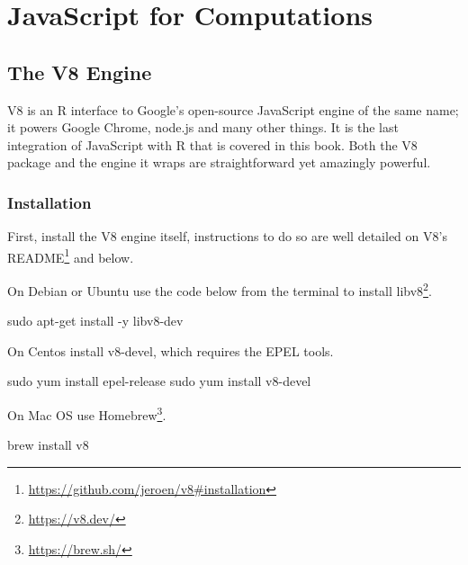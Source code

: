 \documentclass[
]{krantz}
\makeatletter
\newenvironment{Shaded}{\begin{snugshade}}{\end{snugshade}}
\newcommand{\ExtensionTok}[1]{#1}
\newcommand{\FunctionTok}[1]{\textcolor[rgb]{0,0,0}{#1}}
\newcommand{\NormalTok}[1]{#1}
\renewcommand{\href}[2]{#2\footnote{\url{#1}}}
\newenvironment{kframe}{%
\medskip{}
\setlength{\fboxsep}{.8em}
 \def\at@end@of@kframe{}%
 \ifinner\ifhmode%
  \def\at@end@of@kframe{\end{minipage}}%
  \begin{minipage}{\columnwidth}%
 \fi\fi%
 \def\FrameCommand##1{\hskip\@totalleftmargin \hskip-\fboxsep
 \colorbox{shadecolor}{##1}\hskip-\fboxsep
     \hskip-\linewidth \hskip-\@totalleftmargin \hskip\columnwidth}%
 \MakeFramed {\advance\hsize-\width
   \@totalleftmargin\z@ \linewidth\hsize
   \@setminipage}}%
 {\par\unskip\endMakeFramed%
 \at@end@of@kframe}
\renewenvironment{Shaded}{\begin{kframe}}{\end{kframe}}
\makeatother
\begin{document}
\hypertarget{part-javascript-for-computations}{%
\part{JavaScript for Computations}\label{part-javascript-for-computations}}

\hypertarget{v8}{%
\chapter{The V8 Engine}\label{v8}}

V8 is an R interface to Google's open-source JavaScript engine of the same name; it powers Google Chrome, node.js and many other things. It is the last integration of JavaScript with R that is covered in this book. Both the V8 package and the engine it wraps are straightforward yet amazingly powerful.

\hypertarget{v8-installation}{%
\section{Installation}\label{v8-installation}}

First, install the V8 engine itself, instructions to do so are well detailed on \href{https://github.com/jeroen/v8\#installation}{V8's README} and below.

On Debian or Ubuntu use the code below from the terminal to install \href{https://v8.dev/}{libv8}.

\begin{Shaded}
\begin{Highlighting}[]
\FunctionTok{sudo}\NormalTok{ apt{-}get install {-}y libv8{-}dev}
\end{Highlighting}
\end{Shaded}

On Centos install v8-devel, which requires the EPEL tools.

\begin{Shaded}
\begin{Highlighting}[]
\FunctionTok{sudo}\NormalTok{ yum install epel{-}release}
\FunctionTok{sudo}\NormalTok{ yum install v8{-}devel}
\end{Highlighting}
\end{Shaded}

On Mac OS use \href{https://brew.sh/}{Homebrew}.

\begin{Shaded}
\begin{Highlighting}[]
\ExtensionTok{brew}\NormalTok{ install v8}
\end{Highlighting}
\end{Shaded}
\end{document}
